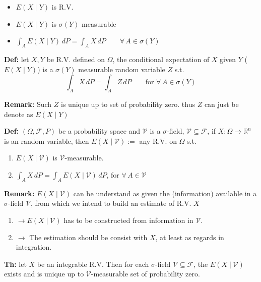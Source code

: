 \documentclass[
  letterpaper,
  DIV=11,
  numbers=noendperiod]{scrreprt}
\providecommand{\tightlist}{%
  \setlength{\itemsep}{0pt}\setlength{\parskip}{0pt}}
\theoremstyle{definition}
\theoremstyle{plain}
\theoremstyle{plain}
\theoremstyle{definition}
\theoremstyle{plain}
\theoremstyle{plain}
\theoremstyle{remark}
\begin{document}
\begin{itemize}
\tightlist
\item
  \(E(X \mid Y)\) is R.V.
\item
  \(E(X \mid Y)\) is \(\sigma(Y)\) measurable
\item
  \(\int_A E(X \mid Y) \, dP = \int_A X \, dP \qquad \forall\, A \in \sigma(Y)\)
\end{itemize}

\textbf{Def:} let \(X, Y\) be R.V. defined on \(\Omega\), the
conditional expectation of \(X\) given \(Y\) (\(E(X \mid Y)\)) is a
\(\sigma(Y)\) measurable random variable \(Z\) s.t. \[
\int_A X \, dP = \int_A Z \, dP \qquad \text{for } \forall\, A \in \sigma(Y)
\]

\textbf{Remark:} Such \(Z\) is unique up to set of probability zero.
thus \(Z\) can just be denote as \(E(X \mid Y)\)

\textbf{Def:} \((\Omega, \mathcal{F}, P)\) be a probability space and
\(\mathcal{V}\) is a \(\sigma\)-field,
\(\mathcal{V} \subseteq \mathcal{F}\), if
\(X : \Omega \to \mathbb{R}^n\) is an random variable, then
\(E(X \mid \mathcal{V}) :=\) any R.V. on \(\Omega\) s.t.

\begin{enumerate}
\def\labelenumi{(\roman{enumi})}
\item
  \(E(X \mid \mathcal{V})\) is \(\mathcal{V}\)-measurable.
\item
  \(\int_A X \, dP = \int_A E(X \mid \mathcal{V}) \, dP\), for
  \(\forall\, A \in \mathcal{V}\)
\end{enumerate}

\textbf{Remark:} \(E(X \mid \mathcal{V})\) can be understand as given
the (information) available in a \(\sigma\)-field \(\mathcal{V}\), from
which we intend to build an estimate of R.V. \(X\)

\begin{enumerate}
\def\labelenumi{(\roman{enumi})}
\item
  \(\to E(X \mid \mathcal{V})\) has to be constructed from information
  in \(\mathcal{V}\).
\item
  \(\to\) The estimation should be consist with \(X\), at least as
  regards in integration.
\end{enumerate}

\textbf{Th:} let \(X\) be an integrable R.V. Then for each
\(\sigma\)-field \(\mathcal{V} \subseteq \mathcal{F}\), the
\(E(X \mid \mathcal{V})\) exists and is unique up to
\(\mathcal{V}\)-measurable set of probability zero.
\end{document}
